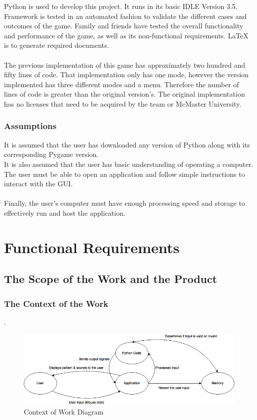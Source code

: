 \documentclass[12pt, titlepage]{article}
\begin{document}
Python is used to develop this project. It runs in its basic IDLE Version 3.5. Framework is tested in an automated fashion to validate the different cases and outcomes of the game. Family and friends have tested the overall functionality and performance of the game, as well as its non-functional requirements. LaTeX is to generate required documents.\\
\\
The previous implementation of this game has approximately two hundred and fifty lines of code. That implementation only has one mode, however the version implemented has three different modes and a menu. Therefore the number of lines of code is greater than the original version's. The original implementation has no licenses that need to be acquired by the team or McMaster University.

\subsubsection{Assumptions}
It is assumed that the user has downloaded any version of Python along with its corresponding Pygame version.
\\
It is also assumed that the user has basic understanding of operating a computer. The user must be able to open an application and follow simple instructions to interact with the GUI.\\
\\
Finally, the user's computer must have enough processing speed and storage to effectively run and host the application.

\section{Functional Requirements}
\subsection{The Scope of the Work and the Product}

\subsubsection{The Context of the Work}
.
\begin {figure}[h]
	\includegraphics [width = \linewidth] {Context_Of_Work.png}
	\caption {Context of Work Diagram}
	\label {Figure: Context of Work}
\end {figure}
\end{document}
